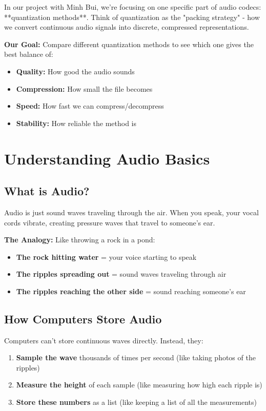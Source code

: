 \documentclass[12pt]{article}
\begin{document}
In our project with Minh Bui, we're focusing on one specific part of audio codecs: **quantization methods**. Think of quantization as the "packing strategy" - how we convert continuous audio signals into discrete, compressed representations.

\textbf{Our Goal:} Compare different quantization methods to see which one gives the best balance of:
\begin{itemize}
    \item \textbf{Quality:} How good the audio sounds
    \item \textbf{Compression:} How small the file becomes
    \item \textbf{Speed:} How fast we can compress/decompress
    \item \textbf{Stability:} How reliable the method is
\end{itemize}

\section{Understanding Audio Basics}

\subsection{What is Audio?}

Audio is just sound waves traveling through the air. When you speak, your vocal cords vibrate, creating pressure waves that travel to someone's ear.

\textbf{The Analogy:} Like throwing a rock in a pond:
\begin{itemize}
    \item \textbf{The rock hitting water} = your voice starting to speak
    \item \textbf{The ripples spreading out} = sound waves traveling through air
    \item \textbf{The ripples reaching the other side} = sound reaching someone's ear
\end{itemize}

\subsection{How Computers Store Audio}

Computers can't store continuous waves directly. Instead, they:
\begin{enumerate}
    \item \textbf{Sample the wave} thousands of times per second (like taking photos of the ripples)
    \item \textbf{Measure the height} of each sample (like measuring how high each ripple is)
    \item \textbf{Store these numbers} as a list (like keeping a list of all the measurements)
\end{enumerate}
\end{document}
